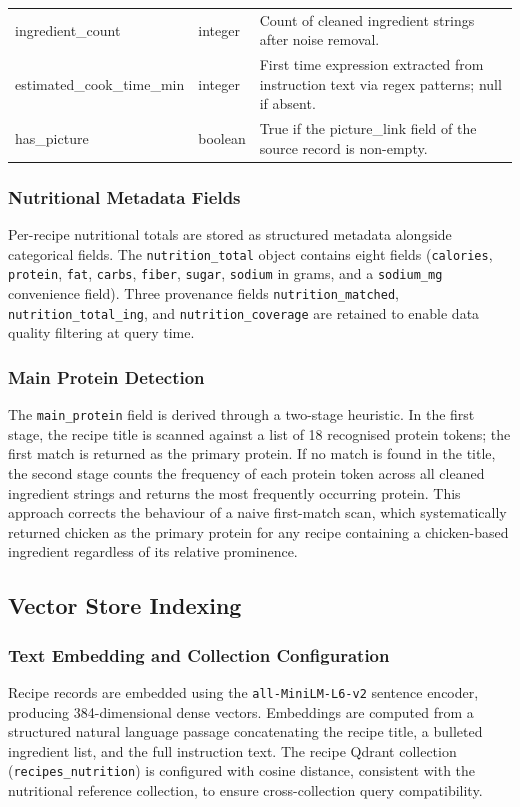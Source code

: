 \documentclass[conference]{IEEEtran}
\begin{document}
\begin{table}[!t]
\begin{tabular}{p{3.5cm} p{1.8cm} p{10.5cm}}
ingredient\_count & integer &
Count of cleaned ingredient strings after noise removal. \\

estimated\_cook\_time\_min & integer &
First time expression extracted from instruction text via regex patterns;
null if absent. \\

has\_picture & boolean &
True if the picture\_link field of the source record is non-empty. \\

\bottomrule
\end{tabular}
\end{table}

\subsubsection{Nutritional Metadata Fields}
Per-recipe nutritional totals are stored as structured metadata alongside categorical fields. The \texttt{nutrition\_total} object contains eight
fields (\texttt{calories}, \texttt{protein}, \texttt{fat},
\texttt{carbs}, \texttt{fiber}, \texttt{sugar},
\texttt{sodium} in grams, and a \texttt{sodium\_mg} convenience field).
Three provenance fields \texttt{nutrition\_matched},
\texttt{nutrition\_total\_ing}, and \texttt{nutrition\_coverage} are
retained to enable data quality filtering at query time.

\subsubsection{Main Protein Detection}
The \texttt{main\_protein} field is derived through a two-stage heuristic. In the first stage, the recipe title is scanned against a list of 18 recognised protein tokens; the first match is returned as the primary protein. If no match is found in the title, the second stage counts the frequency of each protein token across all cleaned ingredient strings and returns the most frequently occurring protein. This approach corrects the behaviour of a naive first-match scan, which systematically returned chicken as the primary protein for any recipe containing a chicken-based ingredient regardless of its relative prominence.

\subsection{Vector Store Indexing}
\subsubsection{Text Embedding and Collection Configuration}
Recipe records are embedded using the \texttt{all-MiniLM-L6-v2}
sentence encoder, producing 384-dimensional dense vectors.
Embeddings are computed from a structured natural language passage concatenating the recipe title, a bulleted ingredient list, and the full instruction text. The recipe Qdrant collection
(\texttt{recipes\_nutrition}) is configured with cosine distance,
consistent with the nutritional reference collection, to ensure
cross-collection query compatibility.
\end{document}
